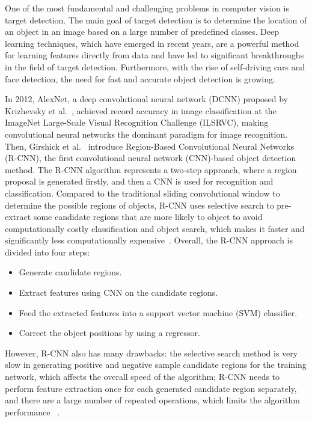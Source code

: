 One of the most fundamental and challenging problems in computer vision is target detection. The main goal of target detection is to determine the location of an object in an image based on a large number of predefined classes. Deep learning techniques, which have emerged in recent years, are a powerful method for learning features directly from data and have led to significant breakthroughs in the field of target detection. Furthermore, with the rise of self-driving cars and face detection, the need for fast and accurate object detection is growing.

In 2012, AlexNet, a deep convolutional neural network (DCNN) proposed by Krizhevsky et al.~\cite{krizhevsky2012imagenet}, achieved record accuracy in image classification at the ImageNet Large-Scale Visual Recognition Challenge (ILSRVC), making convolutional neural networks the dominant paradigm for image recognition. Then, Girshick et al.~\cite{girshick2014rich} introduce Region-Based Convolutional Neural Networks (R-CNN), the first convolutional neural network (CNN)-based object detection method. The R-CNN algorithm represents a two-step approach, where a region proposal is generated firstly, and then a CNN is used for recognition and classification. Compared to the traditional sliding convolutional window to determine the possible regions of objects, R-CNN uses selective search to pre-extract some candidate regions that are more likely to object to avoid computationally costly classification and object search, which makes it faster and significantly less computationally expensive~\cite{ uijlings2013selective, girshick2014rich}. Overall, the R-CNN approach is divided into four steps:

\begin{itemize}
    \item Generate candidate regions.
    \item Extract features using CNN on the candidate regions.
    \item Feed the extracted features into a support vector machine (SVM) classifier.
    \item Correct the object positions by using a regressor.
\end{itemize}

However, R-CNN also has many drawbacks: the selective search method is very slow in generating positive and negative sample candidate regions for the training network, which affects the overall speed of the algorithm; R-CNN needs to perform feature extraction once for each generated candidate region separately, and there are a large number of repeated operations, which limits the algorithm performance ~\cite{huang2017speed}.

